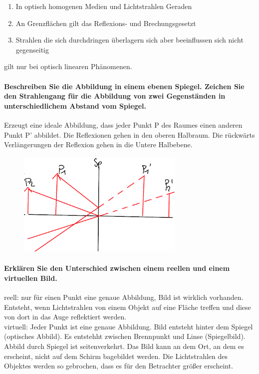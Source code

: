 \documentclass[a4paper, 11pt, parskip=half]{scrartcl}
\begin{document}
\begin{enumerate}
\item In optisch homogenen Medien und Lichtstrahlen Geraden
\item An Grenzflächen gilt das Reflexions- und Brechungsgesetzt
\item Strahlen die sich durchdringen überlagern sich aber beeinflussen sich nicht gegenseitig
\end{enumerate}
 
gilt nur bei optisch linearen Phänomenen.

\paragraph{Beschreiben Sie die Abbildung in einem ebenen Spiegel. Zeichen Sie den Strahlengang für
die Abbildung von zwei Gegenständen in unterschiedlichem Abstand vom Spiegel.}

Erzeugt eine ideale Abbildung, dass jeder Punkt P des Raumes einen anderen Punkt P' abbildet. Die Reflexionen gehen in den oberen Halbraum.  Die rückwärts Verlängerungen der Reflexion gehen in die Untere Halbebene.

\begin{figure}[H]
    \centering
    \includegraphics[width=8cm]{image/17/geo12}
\end{figure}


\paragraph{Erklären Sie den Unterschied zwischen einem reellen und einem virtuellen Bild.}

reell: nur für einen Punkt eine genaue Abbildung, Bild ist wirklich vorhanden. Entsteht, wenn Lichtstrahlen von einem Objekt auf eine Fläche treffen und diese von dort in das Auge reflektiert werden.\\
virtuell: Jeder Punkt ist eine genaue Abbildung. Bild entsteht hinter dem Spiegel (optisches Abbild). Es entstehht zwischen Brennpunkt und Linse (Spiegelbild).  Abbild durch Spiegel ist seitenverkehrt.  Das Bild kann an dem Ort, an dem es erscheint, nicht auf dem Schirm bagebildet werden. Die Lichtstrahlen des Objektes werden so gebrochen, dass es für den Betrachter größer erscheint.
\end{document}
